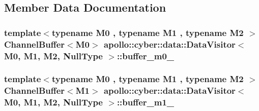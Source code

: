 \subsection{Member Data Documentation}
\hypertarget{classapollo_1_1cyber_1_1data_1_1DataVisitor_3_01M0_00_01M1_00_01M2_00_01NullType_01_4_a70d4d6ba83925cbf3944cb0ebb517ba7}{
\subsubsection[{buffer\-\_\-m0\-\_\-}]{\setlength{\rightskip}{0pt plus 5cm}template$<$typename M0 , typename M1 , typename M2 $>$ {\bf Channel\-Buffer}$<$M0$>$ {\bf apollo\-::cyber\-::data\-::\-Data\-Visitor}$<$ M0, M1, M2, {\bf Null\-Type} $>$\-::buffer\-\_\-m0\-\_\-\hspace{0.3cm}{\ttfamily [private]}}}\label{classapollo_1_1cyber_1_1data_1_1DataVisitor_3_01M0_00_01M1_00_01M2_00_01NullType_01_4_a70d4d6ba83925cbf3944cb0ebb517ba7}
\hypertarget{classapollo_1_1cyber_1_1data_1_1DataVisitor_3_01M0_00_01M1_00_01M2_00_01NullType_01_4_a386121942253c6fedf37b8d57fca8d9b}{
\subsubsection[{buffer\-\_\-m1\-\_\-}]{\setlength{\rightskip}{0pt plus 5cm}template$<$typename M0 , typename M1 , typename M2 $>$ {\bf Channel\-Buffer}$<$M1$>$ {\bf apollo\-::cyber\-::data\-::\-Data\-Visitor}$<$ M0, M1, M2, {\bf Null\-Type} $>$\-::buffer\-\_\-m1\-\_\-\hspace{0.3cm}{\ttfamily [private]}}}\label{classapollo_1_1cyber_1_1data_1_1DataVisitor_3_01M0_00_01M1_00_01M2_00_01NullType_01_4_a386121942253c6fedf37b8d57fca8d9b}
